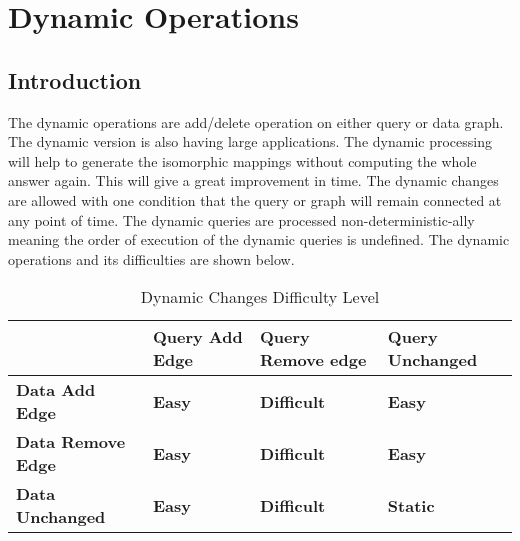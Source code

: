 \chapter{Dynamic Operations}
 \label{chap:dynamic}
 \section{Introduction}
	\hspace{10mm} The dynamic operations are add/delete operation on either query or data graph. The dynamic version is also having large applications. The dynamic processing will help to generate the isomorphic mappings without computing the whole answer again. This will give a great improvement in time. The dynamic changes are allowed with one condition that the query or graph will remain connected at any point of time. The dynamic queries are processed non-deterministic-ally meaning the order of execution of the dynamic queries is undefined. The dynamic operations and its difficulties are shown below.
	\begin{table}[H]
\centering
\begin{tabular}{|m{4cm}|m{4cm}|m{4cm}|m{4cm}|}
\hline
\textbf{}                                  & \textbf{Query Add Edge}                     & \textbf{Query Remove edge}                                 & \textbf{Query Unchanged} \\ \hline
\textbf{Data Add Edge}                                  & \textbf{Easy}                     & \textbf{Difficult}                                 & \textbf{Easy} \\ \hline
\textbf{Data Remove Edge}                                  & \textbf{Easy}                     & \textbf{Difficult}                                 & \textbf{Easy} \\ \hline
\textbf{Data Unchanged}                                  & \textbf{Easy}                     & \textbf{Difficult}                                 & \textbf{Static} \\ \hline
\end{tabular}
\caption{Dynamic Changes Difficulty Level}
\end{table}
